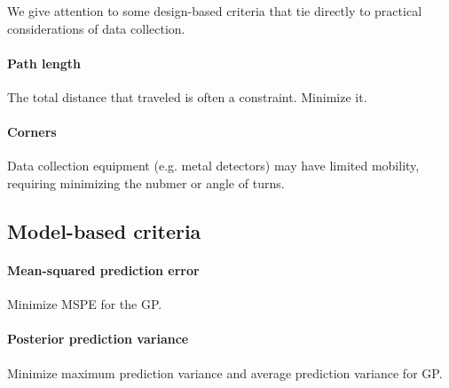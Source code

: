 \documentclass[review]{elsarticle}
\begin{document}
We give attention to some design-based criteria that tie directly to practical
considerations of data collection.

\paragraph{Path length}
The total distance that traveled is often a constraint. Minimize it.

\paragraph{Corners}
Data collection equipment (e.g. metal detectors) may have limited mobility,
requiring minimizing the nubmer or angle of turns.




\subsection{Model-based criteria}

\paragraph{Mean-squared prediction error}
Minimize MSPE for the GP.

\paragraph{Posterior prediction variance}
Minimize maximum prediction variance and average prediction variance for GP.
\end{document}
